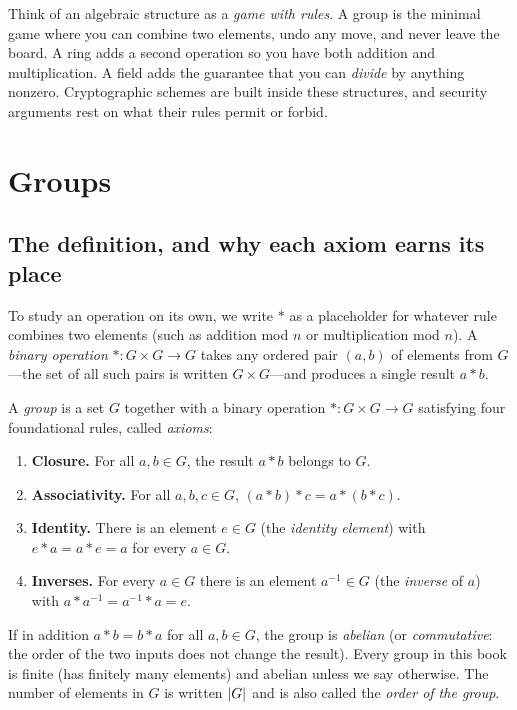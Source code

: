\begin{intuitionbox}
Think of an algebraic structure as a \emph{game with rules}. A group is the minimal game where you
can combine two elements, undo any move, and never leave the board. A ring adds a second
operation so you have both addition and multiplication. A field adds the guarantee that
you can \emph{divide} by anything nonzero. Cryptographic schemes are built inside these structures, and security arguments rest on what their rules permit or forbid.
\end{intuitionbox}

\section{Groups}
\label{ch05:groups}

\subsection{The definition, and why each axiom earns its place}

To study an operation on its own, we write $\ast$ as a placeholder for whatever rule combines two elements (such as addition mod $n$ or multiplication mod $n$). A \emph{binary operation} $\ast : G \times G \to G$ takes any ordered pair $(a,b)$ of elements from $G$---the set of all such pairs is written $G \times G$---and produces a single result $a \ast b$.

\begin{definition}[Group]
\label{ch05:def-group}
A \emph{group} is a set $G$ together with a binary operation $\ast : G \times G \to G$
satisfying four foundational rules, called \emph{axioms}:
\begin{enumerate}
  \item \textbf{Closure.} For all $a,b \in G$, the result $a \ast b$ belongs to $G$.
  \item \textbf{Associativity.} For all $a,b,c \in G$, $(a \ast b)\ast c = a \ast (b \ast c)$.
  \item \textbf{Identity.} There is an element $e \in G$ (the \emph{identity element}) with $e \ast a = a \ast e = a$ for every $a \in G$.
  \item \textbf{Inverses.} For every $a \in G$ there is an element $a^{-1} \in G$ (the \emph{inverse} of $a$) with
        $a \ast a^{-1} = a^{-1} \ast a = e$.
\end{enumerate}
If in addition $a \ast b = b \ast a$ for all $a,b \in G$, the group is \emph{abelian}
(or \emph{commutative}: the order of the two inputs does not change the result). Every group in this book is finite (has finitely many elements) and abelian unless we say otherwise. The number of elements in $G$ is written $\lvert G\rvert$ and is also called the \emph{order of the group}.
\end{definition}

